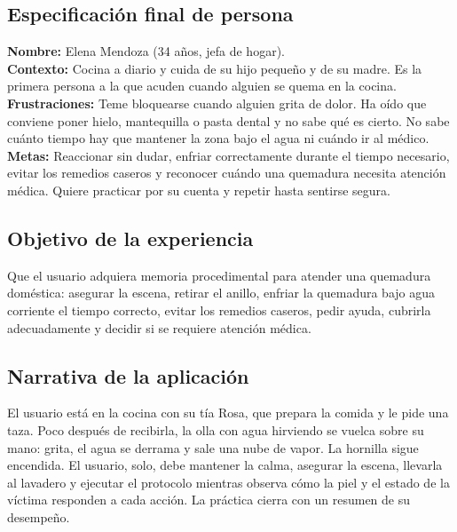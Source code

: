 \documentclass[11pt,a4paper]{article}
\begin{document}
\subsection{Especificación final de persona}
\textbf{Nombre:} Elena Mendoza (34 años, jefa de hogar).\\
\textbf{Contexto:} Cocina a diario y cuida de su hijo pequeño y de su madre. Es la primera persona a la que acuden cuando alguien se quema en la cocina.\\
\textbf{Frustraciones:} Teme bloquearse cuando alguien grita de dolor. Ha oído que conviene poner hielo, mantequilla o pasta dental y no sabe qué es cierto. No sabe cuánto tiempo hay que mantener la zona bajo el agua ni cuándo ir al médico.\\
\textbf{Metas:} Reaccionar sin dudar, enfriar correctamente durante el tiempo necesario, evitar los remedios caseros y reconocer cuándo una quemadura necesita atención médica. Quiere practicar por su cuenta y repetir hasta sentirse segura.

\subsection{Objetivo de la experiencia}
Que el usuario adquiera memoria procedimental para atender una quemadura doméstica: asegurar la escena, retirar el anillo, enfriar la quemadura bajo agua corriente el tiempo correcto, evitar los remedios caseros, pedir ayuda, cubrirla adecuadamente y decidir si se requiere atención médica.

\subsection{Narrativa de la aplicación}
El usuario está en la cocina con su tía Rosa, que prepara la comida y le pide una taza. Poco después de recibirla, la olla con agua hirviendo se vuelca sobre su mano: grita, el agua se derrama y sale una nube de vapor. La hornilla sigue encendida. El usuario, solo, debe mantener la calma, asegurar la escena, llevarla al lavadero y ejecutar el protocolo mientras observa cómo la piel y el estado de la víctima responden a cada acción. La práctica cierra con un resumen de su desempeño.
\end{document}
